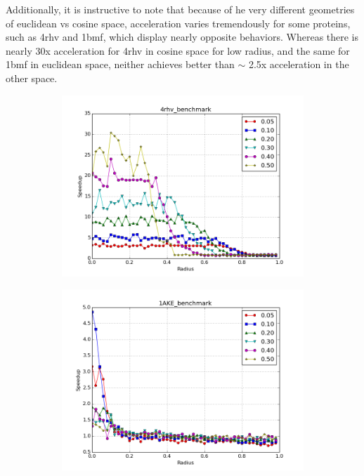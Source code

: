 \documentclass[review,preprint,12pt]{elsarticle}
\theoremstyle{definition}
\theoremstyle{remark}
\numberwithin{equation}{section}
\begin{document}
Additionally, it is instructive to note that because of he very different geometries of euclidean vs cosine space, acceleration varies tremendously for some proteins, such as 4rhv and 1bmf, which display nearly opposite behaviors.
Whereas there is nearly 30x acceleration for 4rhv in cosine space for low radius, and the same for 1bmf in euclidean space, neither achieves better than $\sim$ 2.5x acceleration in the other space.

\begin{figure}[tbp]
    \centering
    \begin{subfigure}[b]{0.49\textwidth}
        \includegraphics[width=1\textwidth]{assets/4rhv_benchmark_cosine}
        \caption{}
    \end{subfigure}%
    \begin{subfigure}[b]{0.49\textwidth}
        \includegraphics[width=1\textwidth]{assets/1AKE_benchmark_cosine}

\end{subfigure}
\end{figure}
\end{document}
